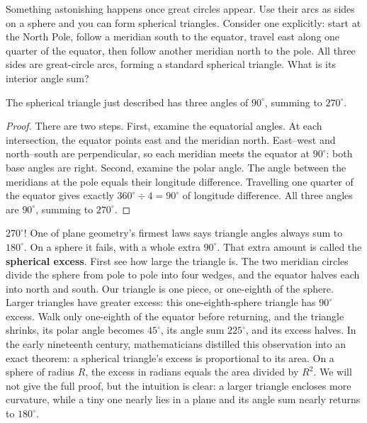 Something astonishing happens once great circles appear. Use their arcs as sides on a sphere and you can form spherical triangles. Consider one explicitly: start at the North Pole, follow a meridian south to the equator, travel east along one quarter of the equator, then follow another meridian north to the pole. All three sides are great-circle arcs, forming a standard spherical triangle. What is its interior angle sum?

\begin{dingli}
The spherical triangle just described has three angles of $90^\circ$, summing to $270^\circ$.
\end{dingli}

\begin{proof}
There are two steps. First, examine the equatorial angles. At each intersection, the equator points east and the meridian north. East--west and north--south are perpendicular, so each meridian meets the equator at $90^\circ$: both base angles are right. Second, examine the polar angle. The angle between the meridians at the pole equals their longitude difference. Travelling one quarter of the equator gives exactly $360^\circ \div 4 = 90^\circ$ of longitude difference. All three angles are $90^\circ$, summing to $270^\circ$.
\end{proof}

\begin{center}
\end{center}

$270^\circ$! One of plane geometry's firmest laws says triangle angles always sum to $180^\circ$. On a sphere it fails, with a whole extra $90^\circ$. That extra amount is called the \textbf{spherical excess}. First see how large the triangle is. The two meridian circles divide the sphere from pole to pole into four wedges, and the equator halves each into north and south. Our triangle is one piece, or one-eighth of the sphere. Larger triangles have greater excess: this one-eighth-sphere triangle has $90^\circ$ excess. Walk only one-eighth of the equator before returning, and the triangle shrinks, its polar angle becomes $45^\circ$, its angle sum $225^\circ$, and its excess halves. In the early nineteenth century, mathematicians distilled this observation into an exact theorem: a spherical triangle's excess is proportional to its area. On a sphere of radius $R$, the excess in radians equals the area divided by $R^2$. We will not give the full proof, but the intuition is clear: a larger triangle encloses more curvature, while a tiny one nearly lies in a plane and its angle sum nearly returns to $180^\circ$.

